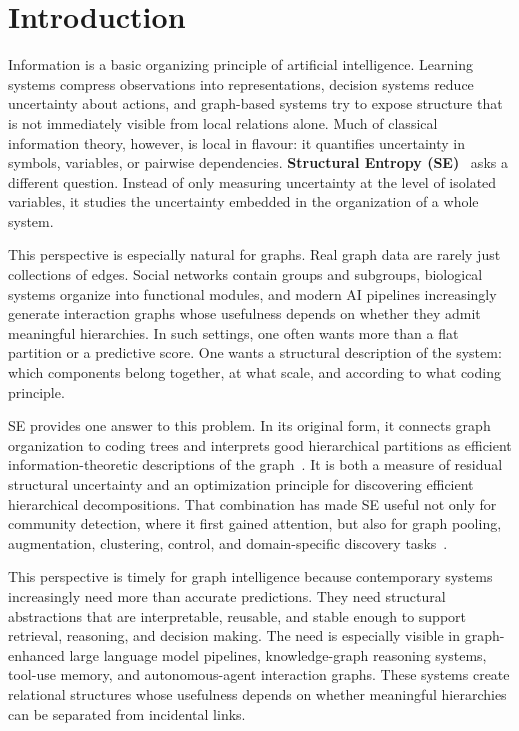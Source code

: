 \section{Introduction}
\label{sec:introduction}

Information is a basic organizing principle of artificial intelligence.
Learning systems compress observations into representations, decision systems
reduce uncertainty about actions, and graph-based systems try to expose
structure that is not immediately visible from local relations alone.
Much of classical information theory, however, is local in flavour: it
quantifies uncertainty in symbols, variables, or pairwise dependencies.
\textbf{Structural Entropy (SE)}~\cite{Li2016} asks a different question.
Instead of only measuring uncertainty at the level of isolated variables, it
studies the uncertainty embedded in the organization of a whole system.

This perspective is especially natural for graphs.
Real graph data are rarely just collections of edges.
Social networks contain groups and subgroups, biological systems organize into
functional modules, and modern AI pipelines increasingly generate interaction
graphs whose usefulness depends on whether they admit meaningful hierarchies.
In such settings, one often wants more than a flat partition or a predictive
score.
One wants a structural description of the system: which components belong
together, at what scale, and according to what coding principle.

SE provides one answer to this problem.
In its original form, it connects graph organization to coding trees and
interprets good hierarchical partitions as efficient information-theoretic
descriptions of the graph~\cite{Li2016}.
It is both a measure of residual structural uncertainty and an optimization
principle for discovering efficient hierarchical decompositions.
That combination has made SE useful not only for community detection, where it
first gained attention, but also for graph pooling, augmentation, clustering,
control, and domain-specific discovery tasks~\cite{wu2022pooling,wu2023sega,zeng2025sidmJMLR,zhang2021supertad,peng2024zjyun,zhu2023HiTIN}.

This perspective is timely for graph intelligence because contemporary systems
increasingly need more than accurate predictions.
They need structural abstractions that are interpretable, reusable, and stable
enough to support retrieval, reasoning, and decision making.
The need is especially visible in graph-enhanced large language model
pipelines, knowledge-graph reasoning systems, tool-use memory, and
autonomous-agent interaction graphs.
These systems create relational structures whose usefulness depends on whether
meaningful hierarchies can be separated from incidental links.

